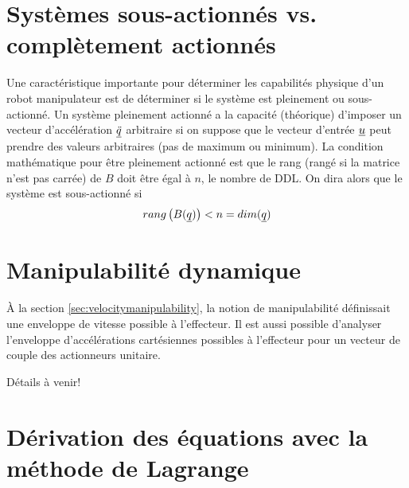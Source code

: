 \section{Systèmes sous-actionnés vs. complètement actionnés}
\label{sec:underactuated}

Une caractéristique importante pour déterminer les capabilités physique d'un robot manipulateur est de déterminer si le système est pleinement ou sous-actionné. Un système pleinement actionné a la capacité (théorique) d'imposer un vecteur d'accélération $\underline{\ddot{q}}$ arbitraire si on suppose que le vecteur d'entrée $\underline{u}$ peut prendre des valeurs arbitraires (pas de maximum ou minimum). La condition mathématique pour être pleinement actionné est que le rang (rangé si la matrice n'est pas carrée) de $B$ doit être égal à $n$, le nombre de DDL. On dira alors que le système est sous-actionné si
\begin{align}
rang\left( B(\underline{q}) \right) < n = dim( \underline{q} )
\end{align}

\section{Manipulabilité dynamique}
\label{sec:dynamicmanipulability}

À la section \ref{sec:velocitymanipulability}, la notion de manipulabilité définissait une enveloppe de vitesse possible à l'effecteur. Il est aussi possible d'analyser l'enveloppe d'accélérations cartésiennes possibles à l'effecteur pour un vecteur de couple des actionneurs unitaire. 

Détails à venir!



\newpage
\section{Dérivation des équations avec la méthode de Lagrange}
\label{sec:lagrange}




